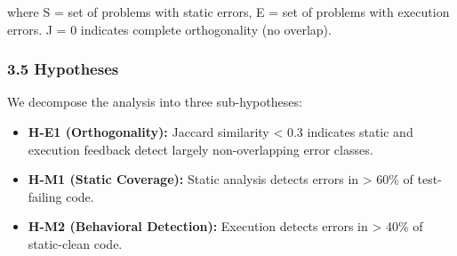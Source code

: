 where S = set of problems with static errors, E = set of problems with execution errors. J = 0 indicates complete orthogonality (no overlap).

\subsubsection{3.5 Hypotheses}

We decompose the analysis into three sub-hypotheses:

\begin{itemize}
\item \textbf{H-E1 (Orthogonality):} Jaccard similarity < 0.3 indicates static and execution feedback detect largely non-overlapping error classes.
\item \textbf{H-M1 (Static Coverage):} Static analysis detects errors in > 60\% of test-failing code.
\item \textbf{H-M2 (Behavioral Detection):} Execution detects errors in > 40\% of static-clean code.
\end{itemize}

